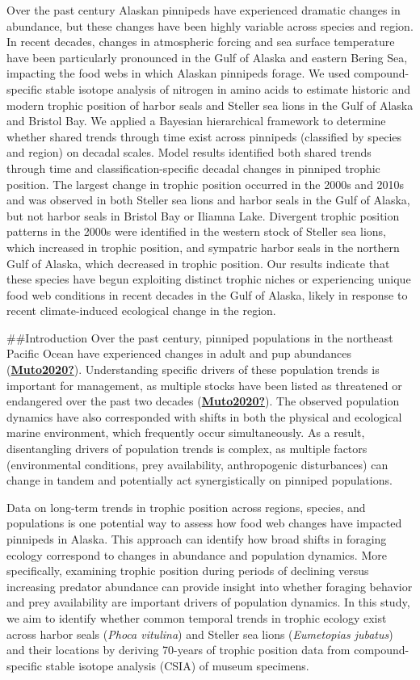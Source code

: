 \documentclass [11pt, proquest] {uwthesis}[2015/03/03]
\begin{document}
Over the past century Alaskan pinnipeds have experienced dramatic changes in abundance, but these changes have been highly variable across species and region. In recent decades, changes in atmospheric forcing and sea surface temperature have been particularly pronounced in the Gulf of Alaska and eastern Bering Sea, impacting the food webs in which Alaskan pinnipeds forage. We used compound-specific stable isotope analysis of nitrogen in amino acids to estimate historic and modern trophic position of harbor seals and Steller sea lions in the Gulf of Alaska and Bristol Bay. We applied a Bayesian hierarchical framework to determine whether shared trends through time exist across pinnipeds (classified by species and region) on decadal scales. Model results identified both shared trends through time and classification-specific decadal changes in pinniped trophic position. The largest change in trophic position occurred in the 2000s and 2010s and was observed in both Steller sea lions and harbor seals in the Gulf of Alaska, but not harbor seals in Bristol Bay or Iliamna Lake. Divergent trophic position patterns in the 2000s were identified in the western stock of Steller sea lions, which increased in trophic position, and sympatric harbor seals in the northern Gulf of Alaska, which decreased in trophic position. Our results indicate that these species have begun exploiting distinct trophic niches or experiencing unique food web conditions in recent decades in the Gulf of Alaska, likely in response to recent climate-induced ecological change in the region.

\#\#Introduction
Over the past century, pinniped populations in the northeast Pacific Ocean have experienced changes in adult and pup abundances (\protect\hyperlink{ref-Muto2020}{\textbf{Muto2020?}}). Understanding specific drivers of these population trends is important for management, as multiple stocks have been listed as threatened or endangered over the past two decades (\protect\hyperlink{ref-Muto2020}{\textbf{Muto2020?}}). The observed population dynamics have also corresponded with shifts in both the physical and ecological marine environment, which frequently occur simultaneously. As a result, disentangling drivers of population trends is complex, as multiple factors (environmental conditions, prey availability, anthropogenic disturbances) can change in tandem and potentially act synergistically on pinniped populations.

Data on long-term trends in trophic position across regions, species, and populations is one potential way to assess how food web changes have impacted pinnipeds in Alaska. This approach can identify how broad shifts in foraging ecology correspond to changes in abundance and population dynamics. More specifically, examining trophic position during periods of declining versus increasing predator abundance can provide insight into whether foraging behavior and prey availability are important drivers of population dynamics. In this study, we aim to identify whether common temporal trends in trophic ecology exist across harbor seals (\emph{Phoca vitulina}) and Steller sea lions (\emph{Eumetopias jubatus}) and their locations by deriving 70-years of trophic position data from compound-specific stable isotope analysis (CSIA) of museum specimens.
\end{document}
